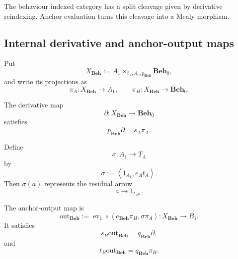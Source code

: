 The behaviour indexed category has a split cleavage given by derivative reindexing. Anchor evaluation turns this cleavage into a Mealy morphism.

\subsection{Internal derivative and anchor-output maps}
\label{subsec:internal-derivative-anchor-output}

\begin{lemma}
\label{lem:internal-derivative-output-maps}
    Put
    \[
        X_{\mathbf{Beh}}
        :=
        A_1
        \times_{t_A,A_0,p_{\mathbf{Beh}}}
        \mathbf{Beh}_0,
    \]
    and write its projections as
    \[
        \pi_A:X_{\mathbf{Beh}}\to A_1,
        \qquad
        \pi_H:X_{\mathbf{Beh}}\to\mathbf{Beh}_0.
    \]

    The derivative map
    \[
        \partial:
        X_{\mathbf{Beh}}\to\mathbf{Beh}_0
    \]
    satisfies
    \[
        p_{\mathbf{Beh}}\partial
        =
        s_A\pi_A.
    \]

    Define
    \[
        \sigma:
        A_1\to T_A
    \]
    by
    \[
        \sigma
        :=
        \left\langle
            1_{A_1},
            e_At_A
        \right\rangle.
    \]
    Then \(\sigma(a)\) represents the residual arrow
    \[
        a\longrightarrow1_{t_Aa}.
    \]

    The anchor-output map is
    \[
        \mathrm{out}_{\mathbf{Beh}}
        :=
        \operatorname{ev}_1
        \circ
        \left\langle
            e_{\mathbf{Beh}}\pi_H,
            \sigma\pi_A
        \right\rangle:
        X_{\mathbf{Beh}}\to B_1.
    \]
    It satisfies
    \[
        s_B\mathrm{out}_{\mathbf{Beh}}
        =
        q_{\mathbf{Beh}}\partial,
    \]
    and
    \[
        t_B\mathrm{out}_{\mathbf{Beh}}
        =
        q_{\mathbf{Beh}}\pi_H.
    \]
\end{lemma}
